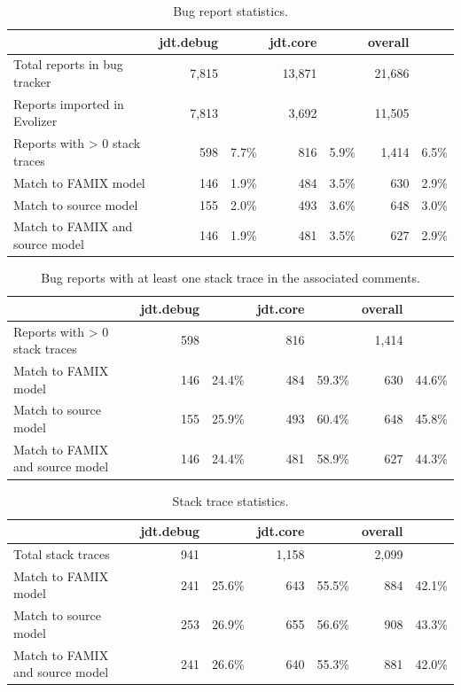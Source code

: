 \begin{table}[!ht]\footnotesize
	\centering
	\begin{tabular}{lrrrrrr}
		\toprule
		& jdt.debug && jdt.core && overall & \\
		\midrule
		Total reports in bug tracker & 7,815 && 13,871 && 21,686 & \\
		Reports imported in Evolizer & 7,813 && 3,692 && 11,505 & \\
		\midrule
		Reports with > 0 stack traces & 598 & 7.7\% & 816 & 5.9\% & 1,414 & 6.5\% \\
		Match to FAMIX model & 146 & 1.9\% & 484 & 3.5\% & 630 & 2.9\% \\
		Match to source model & 155 & 2.0\% & 493 & 3.6\% & 648 & 3.0\% \\
		Match to FAMIX and source model & 146 & 1.9\% & 481 & 3.5\% & 627 & 2.9\% \\
		\bottomrule
	\end{tabular} 
	\caption{Bug report statistics.}
	\label{tab:issues-imported}
\end{table}

\begin{table}[!ht]\footnotesize
	\centering
	\begin{tabular}{lrrrrrr}
		\toprule
		& jdt.debug && jdt.core && overall & \\
		\midrule
		Reports with > 0 stack traces & 598 && 816 && 1,414 & \\
		\midrule
		Match to FAMIX model & 146 & 24.4\% & 484 & 59.3\% & 630 & 44.6\% \\
		Match to source model & 155 & 25.9\% & 493 & 60.4\% & 648 & 45.8\% \\
		Match to FAMIX and source model & 146 & 24.4\% & 481 & 58.9\% & 627 & 44.3\% \\
		\bottomrule
	\end{tabular} 
	\caption{Bug reports with at least one stack trace in the associated comments.}
	\label{tab:issues-st}
\end{table}

\begin{table}[!ht]\footnotesize
	\centering
	\begin{tabular}{lrrrrrr}
		\toprule
		& jdt.debug && jdt.core && overall & \\
		\midrule
		Total stack traces & 941 && 1,158 && 2,099 & \\
		\midrule
		Match to FAMIX model & 241 & 25.6\% & 643 & 55.5\% & 884 & 42.1\% \\
		Match to source model & 253 & 26.9\% & 655 & 56.6\% & 908 & 43.3\% \\
		Match to FAMIX and source model & 241 & 26.6\% & 640 & 55.3\% & 881 & 42.0\% \\
		\bottomrule
	\end{tabular} 
	\caption{Stack trace statistics.}
	\label{tab:st}
\end{table}

